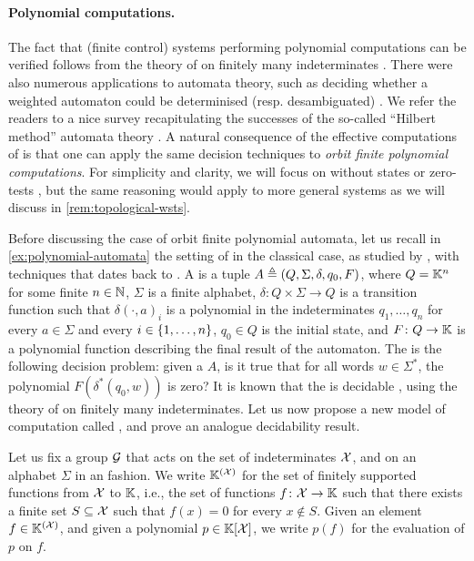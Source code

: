 \paragraph{Polynomial computations.} \AP The fact that (finite control) systems
performing polynomial computations can be verified follows from the theory of
 on finitely many indeterminates \cite{MULSEI02,BEDUSHWO17}.
There were also numerous applications to automata theory, such as deciding
whether a weighted automaton could be determinised (resp. desambiguated)
\cite{BESM23,PUSM24}. We refer the readers to a nice survey recapitulating the
successes of the so-called ``Hilbert method'' automata theory \cite{BOJAN19}. A
natural consequence of the effective computations of  is that one can apply the same decision techniques to \emph{orbit finite
polynomial computations}. For simplicity and clarity, we will focus on
 without states or zero-tests \cite{BEDUSHWO17}, but
the same reasoning would apply to more general systems as we will discuss in
\cref{rem:topological-wsts}.


\AP Before discussing the case of orbit finite polynomial automata, let us
recall in \cref{ex:polynomial-automata} the setting of 
in the classical case, as studied by \cite{BEDUSHWO17}, with techniques that
dates back to \cite{MULSEI02}. A  is a tuple $A
\triangleq (Q, \Sigma, \delta, q_0, F)$, where $Q = \mathbb{K}^n$ for some finite $n \in
\mathbb{N}$, $\Sigma$ is a finite alphabet, $\delta \colon Q \times \Sigma \to Q$ is a
transition function such that $\delta(\cdot,a)_i$ is a polynomial in the
indeterminates $q_1, \dots, q_n$ for every $a \in \Sigma$ and every $i \in
\{ 1, \dots, n \}$, $q_0 \in Q$ is the initial state, and $F \colon Q \to \mathbb{K}$
is a polynomial function describing the final result of the automaton. The
 is the following decision
problem: given a  $A$, is it true that for all words
$w \in \Sigma^*$, the polynomial $F(\delta^*(q_0, w))$ is zero? It is known
that the  is decidable
\cite{BEDUSHWO17}, using the theory of  on finitely many
indeterminates. Let us now propose a new model of computation called , and prove an analogue decidability result.

\AP Let us fix a group $\mathcal{G}$ that acts on the set of indeterminates
$\mathcal{X}$, and on an alphabet $\Sigma$ in an 
fashion. We write $\mathbb{K}^{(\mathcal{X})}$ for the set of finitely supported functions
from $\mathcal{X}$ to $\mathbb{K}$, i.e., the set of functions $f \colon \mathcal{X} \to \mathbb{K}$
such that there exists a finite set $S \subseteq \mathcal{X}$ such that $f(x) = 0$
for every $x \notin S$. Given an element $f \in \mathbb{K}^{(\mathcal{X})}$, and given a
polynomial $p \in \mathbb{K}[\mathcal{X}]$, we write $p(f)$ for the evaluation of
$p$ on $f$.

